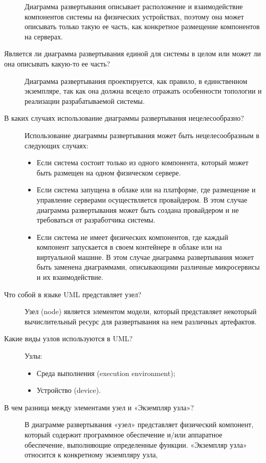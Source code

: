 \begin{description}
		Диаграмма развертывания описывает расположение и взаимодействие
		компонентов системы на физических устройствах,
		поэтому она может описывать только такую ее часть,
		как конкретное размещение компонентов на серверах.
	\item [Является ли диаграмма развертывания единой для системы в целом или
		может ли она описывать какую-то ее часть?]
		Диаграмма развертывания проектируется, как правило,
		в единственном экземпляре, так как она должна всецело отражать
		особенности топологии и реализации разрабатываемой системы.
	\item [В каких случаях использование диаграммы развертывания
		нецелесообразно?]
		Использование диаграммы развертывания может быть нецелесообразным
		в следующих случаях:
		\begin{itemize}
			\item Если система состоит только из одного компонента,
				который может быть размещен на одном физическом сервере.
			\item Если система запущена в облаке или на платформе,
				где размещение и управление серверами осуществляется
				провайдером. В этом случае диаграмма развертывания может
				быть создана провайдером и не требоваться от разработчика
				системы.
			\item Если система не имеет физических компонентов,
				где каждый компонент запускается в своем контейнере в облаке
				или на виртуальной машине. В этом случае диаграмма
				развертывания может быть заменена диаграммами,
				описывающими различные микросервисы и их взаимодействие.
		\end{itemize}
	\item [Что собой в языке UML представляет узел?]
		Узел (node) является элементом модели, который представляет некоторый
		вычислительный ресурс для развертывания на нем различных артефактов.
	\item [Какие виды узлов используются в UML?]
		Узлы:
		\begin{itemize}
			\item Среда выполнения (execution environment);
			\item Устройство (device).
		\end{itemize}
	\item [В чем разница между элементами узел и «Экземпляр узла»?]
		В диаграмме развертывания «узел» представляет физический компонент,
		который содержит программное обеспечение и/или аппаратное обеспечение,
		выполняющие определенные функции.
		«Экземпляр узла» относится к конкретному экземпляру узла,

\end{description}
